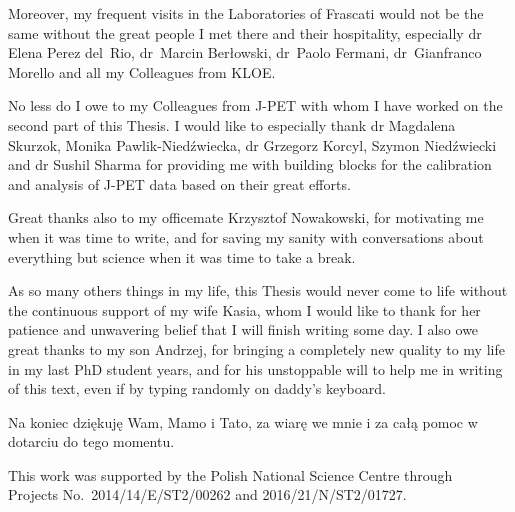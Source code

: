 Moreover, my frequent visits in the Laboratories of Frascati would not be the same without the great people I met there and their hospitality, especially dr Elena Perez del~Rio, dr~Marcin Ber\l{}owski, dr~Paolo Fermani, dr~Gianfranco Morello and all my Colleagues from KLOE.
%

No less do I owe to my Colleagues from J-PET with whom I have worked on the second part of this Thesis. I would like to especially thank dr Magdalena Skurzok, Monika Pawlik-Niedźwiecka, dr Grzegorz Korcyl, Szymon Niedźwiecki and dr Sushil Sharma for providing me with building blocks for the calibration and analysis of J-PET data based on their great efforts.
%

Great thanks also to my officemate Krzysztof Nowakowski, for motivating me when it was time to write, and for saving my sanity with conversations about everything but science when it was time to take a break.


%

%
%

As so many others things in my life, this Thesis would never come to life without the continuous support of my wife Kasia, whom I would like to thank for her patience and unwavering belief that I will finish writing some day. I also owe great thanks to my son Andrzej, for bringing a completely new quality to my life in my last PhD student years, and for his unstoppable will to help me in writing of this text, even if by typing randomly on daddy's keyboard.

\begin{otherlanguage}{polish}
Na koniec dziękuję Wam, Mamo i Tato, za wiarę we mnie i za całą pomoc w dotarciu do tego momentu.
\end{otherlanguage}

\vspace{3cm}

This work was supported by the Polish National Science Centre through\\Projects No.~2014/14/E/ST2/00262 and 2016/21/N/ST2/01727.
%
% 

%
%


